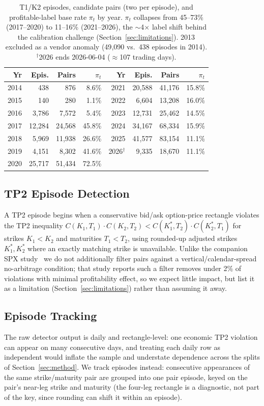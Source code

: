 \documentclass[sigconf,review]{acmart}
\begin{document}
\begin{table}[t]
\centering
\footnotesize
\begin{tabular}{rrrr@{\hskip 1.4em}rrrr}
\toprule
Yr & Epis. & Pairs & $\pi_t$ & Yr & Epis. & Pairs & $\pi_t$ \\
\midrule
2014 & 438 & 876 & 8.6\% & 2021 & 20{,}588 & 41{,}176 & 15.8\% \\
2015 & 140 & 280 & 1.1\% & 2022 & 6{,}604 & 13{,}208 & 16.0\% \\
2016 & 3{,}786 & 7{,}572 & 5.4\% & 2023 & 12{,}731 & 25{,}462 & 14.5\% \\
2017 & 12{,}284 & 24{,}568 & 45.8\% & 2024 & 34{,}167 & 68{,}334 & 15.9\% \\
2018 & 5{,}969 & 11{,}938 & 26.6\% & 2025 & 41{,}577 & 83{,}154 & 11.1\% \\
2019 & 4{,}151 & 8{,}302 & 41.6\% & 2026$^\dagger$ & 9{,}335 & 18{,}670 & 11.1\% \\
2020 & 25{,}717 & 51{,}434 & 72.5\% & & & & \\
\bottomrule
\end{tabular}
\caption{T1/K2 episodes, candidate pairs (two per episode), and profitable-label base rate $\pi_t$ by year. $\pi_t$ collapses from 45--73\% (2017--2020) to 11--16\% (2021--2026), the $\sim$4$\times$ label shift behind the calibration challenge (Section~\ref{sec:limitations}). 2013 excluded as a vendor anomaly (49{,}090 vs.\ 438 episodes in 2014). $^\dagger$2026 ends 2026-06-04 ($\approx$107 trading days).}
\label{tab:peryear}
\end{table}

\subsection{TP2 Episode Detection}
A TP2 episode begins when a conservative bid/ask option-price rectangle violates the TP2 inequality $C(K_1,T_1)\cdot C(K_2,T_2) < C(K_1^{\ast},T_2)\cdot C(K_2^{\ast},T_1)$ for strikes $K_1 < K_2$ and maturities $T_1 < T_2$, using rounded-up adjusted strikes $K_1^{\ast}, K_2^{\ast}$ where an exactly matching strike is unavailable. Unlike the companion SPX study~\cite{glasserman2025tp2} we do not additionally filter pairs against a vertical/calendar-spread no-arbitrage condition; that study reports such a filter removes under 2\% of violations with minimal profitability effect, so we expect little impact, but list it as a limitation (Section~\ref{sec:limitations}) rather than assuming it away.

\subsection{Episode Tracking}
\label{sec:episode-tracking}
The raw detector output is daily and rectangle-level: one economic TP2 violation can appear on many consecutive days, and treating each daily row as independent would inflate the sample and understate dependence across the splits of Section~\ref{sec:method}. We track episodes instead: consecutive appearances of the same strike/maturity pair are grouped into one pair episode, keyed on the pair's near-leg strike and maturity (the four-leg rectangle is a diagnostic, not part of the key, since rounding can shift it within an episode).
\end{document}
